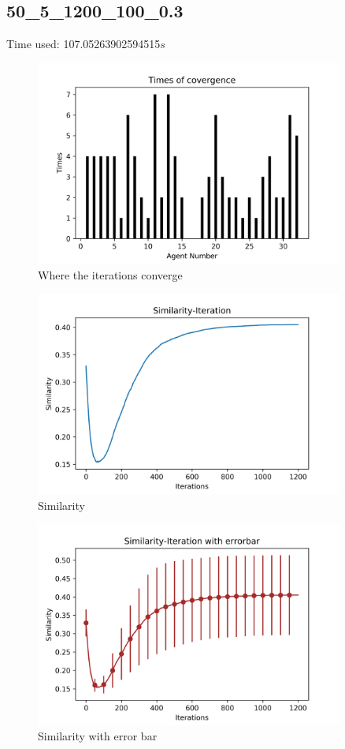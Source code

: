 \documentclass[a4paper,12pt]{article}
\begin{document}
        \subsection{50\_5\_1200\_100\_0.3}
    Time used: 107.05263902594515${s}$
    \begin{figure}[H]
    	\centering
    	\includegraphics[width=0.9\textwidth]{agt50_5_1200_100_3.png}
    	\caption{Where the iterations converge}\label{agt50_5_1200_100_3_h}
    \end{figure}
    \begin{figure}[H]
    	\centering
    	\includegraphics[width=0.9\textwidth]{Sim50_5_1200_100_3}
    	\caption{Similarity}\label{Sim50_5_1200_100_3_h}
    \end{figure}
    \begin{figure}[H]
    	\centering
    	\includegraphics[width=0.9\textwidth]{SimErr50_5_1200_100_3}
    	\caption{Similarity with error bar}\label{SimErr50_5_1200_100_3_h}
    \end{figure}
\end{document}
